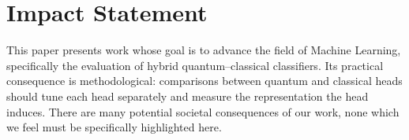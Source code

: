 \documentclass{article}
\theoremstyle{plain}
\theoremstyle{remark}
\begin{document}

\printAffiliationsAndNotice{}

\begin{abstract}

\end{abstract}









\section*{Impact Statement}
This paper presents work whose goal is to advance the field of Machine Learning, specifically
the evaluation of hybrid quantum--classical classifiers. Its practical consequence is
methodological: comparisons between quantum and classical heads should tune each head
separately and measure the representation the head induces. There are many potential
societal consequences of our work, none which we feel must be specifically highlighted here.




\newpage
\appendix
\onecolumn

\end{document}
